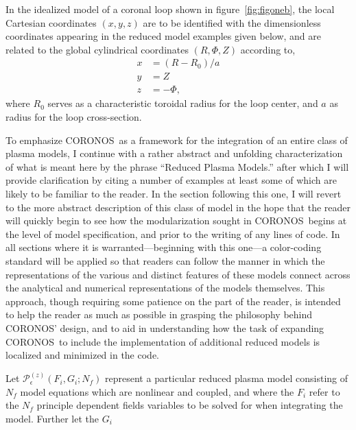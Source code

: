 \documentclass[12pt, letterpaper, oneside, leqno, openright]{memoir}
\newcommand{\coronos}{\textsf{CORONOS}}
\newcommand{\pmodel}{\mathscr{P}}
\begin{document}
%
%
In the idealized model of a coronal loop shown in figure~\ref{fig:figoneb},
the local Cartesian coordinates $(x,y,z)$ are to be identified with the
dimensionless coordinates appearing in the reduced model examples given below,
and are related to the global cylindrical coordinates $(R,\Phi,Z)$ according
to,
%
\begin{subequations}
	      \begin{align}
		      x   &= (R - R_0)/a \\
		      y   &= Z           \\
		      z   &= -\Phi,
	      \end{align}
\end{subequations}
%
where $R_0$ serves as a characteristic toroidal radius for the loop
center, and $a$ as radius for the loop cross-section.
%
\par
%
To emphasize \coronos\ as a framework for the integration of an entire
class of plasma models, I continue with a rather abstract and unfolding
characterization of what is meant here by the phrase ``Reduced
Plasma Models.''  after which I will provide clarification by citing
a number of examples at least some of which are likely to be familiar
to the reader.
%
In the section following this one, I will revert to the more abstract
description of this class of model in the hope that the reader will
quickly begin to see how the modularization sought in \coronos\ begins
at the level of model specification, and prior to the writing of any lines
of code.
%
In all sections where it is warranted---beginning with this one---a
color-coding standard will be applied so that readers can follow the 
manner in which the representations of the various and distinct features
of these models connect across the analytical and numerical representations
of the models themselves. This approach, though requiring some patience 
on the part of the reader, is intended to help the reader as much as 
possible in grasping the philosophy behind \coronos' design, and to aid in
understanding how the task of expanding \coronos\ to include the 
implementation of additional reduced models is localized and minimized
in the code.
%
\par
%
Let $\pmodel^{(z)}_\epsilon(F_i, G_i; N_f)$ represent a particular reduced
plasma model consisting of $N_f$ model equations which are nonlinear and
coupled, and where the $F_i$ refer to the $N_f$ principle dependent fields
variables to be solved for when integrating the model. Further let the $G_i$
\end{document}
